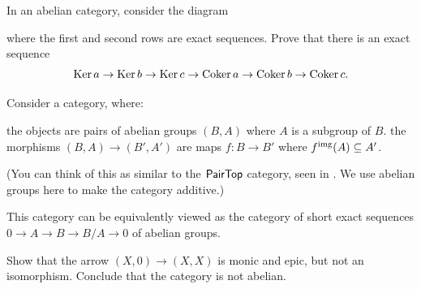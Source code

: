 \begin{sproblem}
	\onechili
	In an abelian category, consider the diagram
	\begin{center}
	\end{center}
	where the first and second rows are exact sequences.
	Prove that there is an exact sequence
	\[ \operatorname{Ker} a \to \operatorname{Ker} b \to \operatorname{Ker} c \to \operatorname{Coker} a \to \operatorname{Coker} b \to \operatorname{Coker} c. \]
	\label{prob:snake}
\end{sproblem}

\begin{problem}
	Consider a category, where:
	\begin{itemize}
		\ii the objects are pairs of abelian groups $(B, A)$ where $A$ is a subgroup of $B$.
		\ii the morphisms $(B, A) \to (B', A')$ are maps $f \colon B \to B'$ where
		$f^{\text{img}}(A) \subseteq A'$.
	\end{itemize}
	(You can think of this as similar to the $\mathsf{PairTop}$ category, seen in
	. We use abelian groups here to make the category additive.)

	This category can be equivalently viewed as the category of short exact sequences
	$0 \to A \to B \to B/A \to 0$ of abelian groups.

	Show that the arrow $(X, 0) \to (X, X)$ is monic and epic, but not an
	isomorphism. Conclude that the category is not abelian.
\end{problem}
